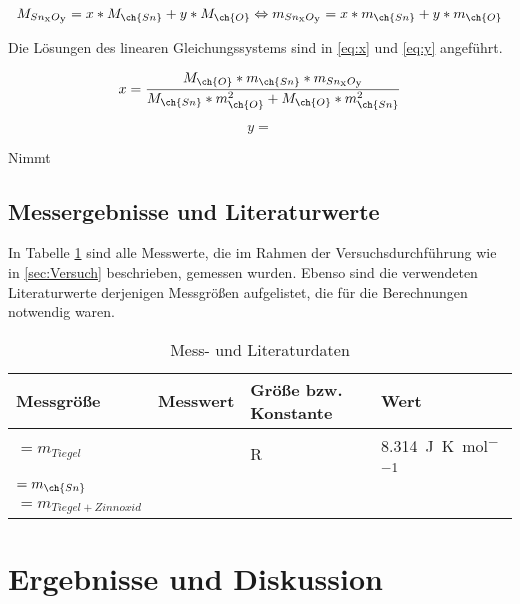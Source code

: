 \documentclass{article}
\begin{document}
      \begin{equation}
        M_{Sn\textsubscript{x}O\textsubscript{y}} = x * M_{\ch{Sn}} + y * M_{\ch{O}}  \Leftrightarrow m_{Sn\textsubscript{x}O\textsubscript{y}} = x * m_{\ch{Sn}} + y * m_{\ch{O}} \label{eq:Molmasse}
      \end{equation} 
      
      Die Lösungen des linearen Gleichungssystems sind in \eqref{eq:x} und \eqref{eq:y} angeführt.
      
      \begin{equation}
        x = \frac{M_{\ch{O}} * m_{\ch{Sn}} * m_{Sn\textsubscript{x}O\textsubscript{y}}}{M_{\ch{Sn}} * m_{\ch{O}}^2 + M_{\ch{O}} * m_{\ch{Sn}}^2} \label{eq:x}
      \end{equation}
      
      \begin{equation}
        y = \label{eq:y}
      \end{equation}
      
      Nimmt 
    \subsection{Messergebnisse und Literaturwerte}
    
      In Tabelle \ref{tab:Messdaten} sind alle Messwerte, die im Rahmen der Versuchsdurchführung wie in \ref{sec:Versuch} beschrieben, gemessen wurden. Ebenso sind die verwendeten Literaturwerte derjenigen Messgrößen aufgelistet, die für die Berechnungen notwendig waren.
      
      \begin{table}[H]
        \centering
        \caption[Mess- und Literaturdaten, Quelle: Autor]{Mess- und Literaturdaten}
        \label{tab:Messdaten}
          \begin{tabular}{@{}ll|ll@{}}
            \toprule
             Messgröße & Messwert & Größe bzw. Konstante & Wert \\ \midrule
             $=m_{Tiegel}$ &  & R & \SI[mode=text]{8.314}{\joule\per\kelvin\per\mol} \\
             $=m_{\ch{Sn}}$ &  &  &  \\
             $= m_{Tiegel+Zinnoxid}$ &  &  &  \\ \bottomrule
          \end{tabular}
       \end{table}      
      
  \section{Ergebnisse und Diskussion}
  
  \pagebreak
  
  \listofreactions
  \printbibliography[title=Literaturverzeichnis]
  \listoffigures
  \listoftables
  
\end{document}
